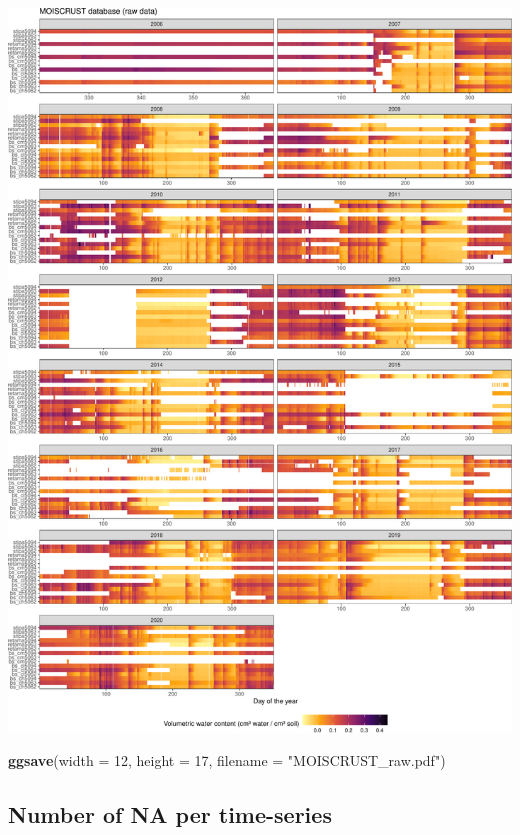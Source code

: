 \documentclass[]{article}
\newenvironment{Shaded}{\begin{snugshade}}{\end{snugshade}}
\newcommand{\DataTypeTok}[1]{\textcolor[rgb]{0.13,0.29,0.53}{#1}}
\newcommand{\DecValTok}[1]{\textcolor[rgb]{0.00,0.00,0.81}{#1}}
\newcommand{\KeywordTok}[1]{\textcolor[rgb]{0.13,0.29,0.53}{\textbf{#1}}}
\newcommand{\NormalTok}[1]{#1}
\newcommand{\StringTok}[1]{\textcolor[rgb]{0.31,0.60,0.02}{#1}}
\begin{document}
\includegraphics{moiscrust_files/figure-latex/unnamed-chunk-6-1.pdf}

\begin{Shaded}
\begin{Highlighting}[]
\KeywordTok{ggsave}\NormalTok{(}\DataTypeTok{width =} \DecValTok{12}\NormalTok{, }\DataTypeTok{height =} \DecValTok{17}\NormalTok{, }\DataTypeTok{filename =} \StringTok{"MOISCRUST_raw.pdf"}\NormalTok{)}
\end{Highlighting}
\end{Shaded}

\hypertarget{number-of-na-per-time-series}{%
\subsection{Number of NA per
time-series}\label{number-of-na-per-time-series}}
\end{document}
